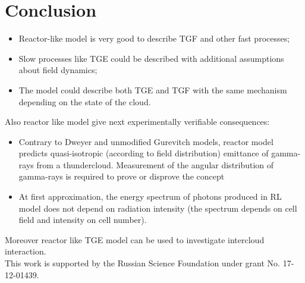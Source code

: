 \documentclass[utf8]{webofc}
\begin{document}
\section{Conclusion}
\begin{itemize}
   	\item Reactor-like model is very good to describe TGF and other fast processes;
   	\item Slow processes like TGE could be described with additional assumptions about field dynamics;
   	\item The model could describe both TGE and TGF with the same mechanism depending on the state of the cloud.
\end{itemize}
Also reactor like model give next experimentally verifiable consequences:
\begin{itemize}
   	\item Contrary to Dweyer and unmodified Gurevitch models, reactor model predicts quasi-isotropic (according to field distribution) emittance of gamma-rays from a thundercloud.  	Measurement of the angular distribution of gamma-rays is required to prove or disprove the concept
   	
   	\item At first approximation, the energy spectrum of photons produced in RL model does not depend on radiation intensity (the spectrum depends on cell field and intensity on cell number).
\end{itemize}
Moreover reactor like TGE model can be used to investigate intercloud interaction.
\\
This work is supported by the Russian Science Foundation under grant No. 17-12-01439.
    
{}
\end{document}

